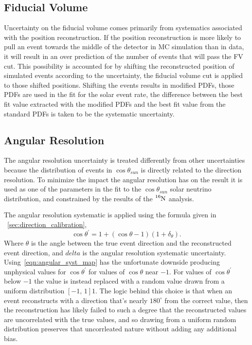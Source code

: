 \subsection{Fiducial Volume}
Uncertainty on the fiducial volume comes primarily from systematics associated
with the position reconstruction.
If the position reconstruction is more likely to pull an event towards the
middle of the detector
in MC simulation than in data, it will result in an over prediction of the
number of events that will pass the FV cut.
This possibility is accounted for by shifting the reconstructed position of
simulated events according to the uncertainty, the fiducial volume cut is
applied to those shifted positions.  Shifting the events results in modified
PDFs, those PDFs are used in the fit for the solar event rate, the difference
between the best fit value extracted with the modified PDFs and the best fit
value from the standard PDFs is taken to be the systematic uncertainty.
\subsection{Angular Resolution}
\label{sec:angular_systematics}
The angular resolution uncertainty is treated differently from other
uncertainties because the distribution of events in $\cos\theta_{sun}$ is
directly related to the direction resolution.  To minimize the impact the
angular resolution has on the result it is used as one of the parameters in the
fit to the $\cos\theta_{sun}$ solar neutrino distribution, and constrained by
the results of the $\ce{^{16}N}$ analysis.

The angular resolution systematic is applied using the formula given in
~\ref{sec:direction_calibration},
\begin{equation}
    \cos\theta^{\prime} = 1 + (\cos\theta - 1)(1+\delta_{\theta})\text{.}
    \label{eqn:angular_syst_map}
\end{equation}
Where $\theta$ is the angle between the true event direction and the reconstructed
event direction, and $delta$ is the angular resolution systematic uncertainty.
Using~\eqref{eqn:angular_syst_map} has the unfortunate downside producing
unphysical values for $\cos\theta^{\prime}$ for values of $\cos\theta$ near
$-1$. For values of $\cos\theta^{\prime}$ below $-1$ the value is instead replaced
with a random value drawn from a uniform distribution $\left[-1\text{, }1\right]1$.
The logic behind this choice is that when an event reconstructs with a direction
that's nearly $180^{\circ}$ from the correct value, then the reconstruction
has likely failed to such a degree that the reconstructed values are uncorrelated
with the true values, and so drawing from a uniform random distribution preserves
that uncorrleated nature without adding any additional bias.

